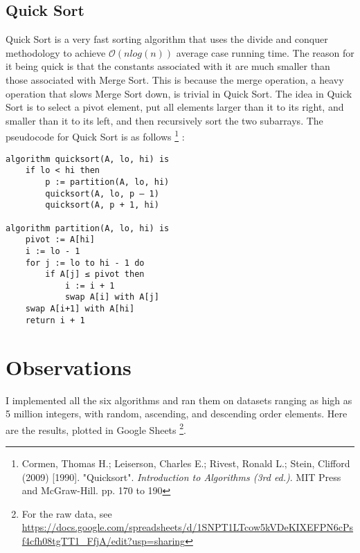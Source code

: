 \documentclass[12pt]{article}
\begin{document}
		\subsection{Quick Sort}
		Quick Sort is a very fast sorting algorithm that uses the divide and conquer methodology to achieve $ \mathcal{O} (n log(n)) $ average case running time. The reason for it being quick is that the constants associated with it are much smaller than those associated with Merge Sort. This is because the merge operation, a heavy operation that slows Merge Sort down, is trivial in Quick Sort. The idea in Quick Sort is to select a pivot element, put all elements larger than it to its right, and smaller than it to its left, and then recursively sort the two subarrays. The pseudocode for Quick Sort is as follows \footnote{Cormen, Thomas H.; Leiserson, Charles E.; Rivest, Ronald L.; Stein, Clifford (2009) [1990]. "Quicksort". \textit{Introduction to Algorithms (3rd ed.)}. MIT Press and McGraw-Hill. pp. 170 to 190} :
		
		\begin{verbatim}
algorithm quicksort(A, lo, hi) is
    if lo < hi then
        p := partition(A, lo, hi)
        quicksort(A, lo, p – 1)
        quicksort(A, p + 1, hi)

algorithm partition(A, lo, hi) is
    pivot := A[hi]
    i := lo - 1    
    for j := lo to hi - 1 do
        if A[j] ≤ pivot then
            i := i + 1
            swap A[i] with A[j]
    swap A[i+1] with A[hi]
    return i + 1
		\end{verbatim}
		
	\section{Observations}
	I implemented all the six algorithms and ran them on datasets ranging as high as 5 million integers, with random, ascending, and descending order elements. Here are the results, plotted in Google Sheets \footnote{For the raw data, see \url{https://docs.google.com/spreadsheets/d/1SNPT1LTcow5kVDeKIXEFPN6cPsf4cfh08tgTT1_FfjA/edit?usp=sharing}}.
		
\end{document}
